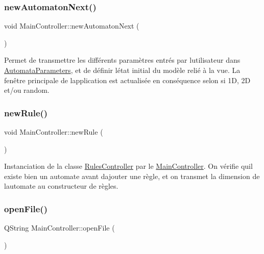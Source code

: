 \subsubsection{\texorpdfstring{new\+Automaton\+Next()}{newAutomatonNext()}}
{\footnotesize\ttfamily void Main\+Controller\+::new\+Automaton\+Next (\begin{DoxyParamCaption}{ }\end{DoxyParamCaption})\hspace{0.3cm}{\ttfamily [private]}}



Permet de transmettre les différents paramètres entrés par l\textquotesingle{}utilisateur dans \mbox{\hyperlink{class_automata_parameters}{Automata\+Parameters}}, et de définir l\textquotesingle{}état initial du modèle relié à la vue. La fenêtre principale de l\textquotesingle{}application est actualisée en conséquence selon si 1D, 2D et/ou random. 

\mbox{\label{class_main_controller_a8083c60cac9d1982633ad543900280a7}} 
\subsubsection{\texorpdfstring{new\+Rule()}{newRule()}}
{\footnotesize\ttfamily void Main\+Controller\+::new\+Rule (\begin{DoxyParamCaption}{ }\end{DoxyParamCaption})\hspace{0.3cm}{\ttfamily [private]}}



Instanciation de la classe \mbox{\hyperlink{class_rules_controller}{Rules\+Controller}} par le \mbox{\hyperlink{class_main_controller}{Main\+Controller}}. On vérifie qu\textquotesingle{}il existe bien un automate avant d\textquotesingle{}ajouter une règle, et on transmet la dimension de l\textquotesingle{}automate au constructeur de règles. 

\mbox{\label{class_main_controller_a8cdfea32087af71164493b68c493a0e5}} 
\subsubsection{\texorpdfstring{open\+File()}{openFile()}}
{\footnotesize\ttfamily Q\+String Main\+Controller\+::open\+File (\begin{DoxyParamCaption}{ }\end{DoxyParamCaption})\hspace{0.3cm}{\ttfamily [private]}}



